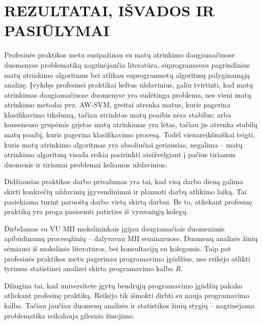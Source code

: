 
\section{REZULTATAI, IŠVADOS IR PASIŪLYMAI}
\label{rezultatai_isvados_pasiulymai}

Profesinės praktikos metu susipažinau su matų atrinkimo daugiamačiuose duomenyse problematiką nagrinėjančia literatūra, suprogramavau pagrindinius matų atrinkimo algoritmus bei atlikau suprogramuotų algoritmų palyginamąją analizę. Įvykdęs profesinei praktikai keltus uždavinius, galiu tvirtinti, kad matų atrinkimas daugiamačiuose duomenyse yra sudėtinga problema, nes vieni matų atrinkimo metodai pvz. AW-SVM, greitai atrenka matus, kurie pagerina klasifikavimo tikslumą, tačiau atrinktas matų poaibis nėra stabilus; arba konsensuso grupėmis grįstas matų atrinkimas yra lėtas, tačiau jis atrenka stabilų matų poaibį, kuris pagerina klasifikavimo procesą. Todėl vienareikšmiškai teigti, kuris matų atrinkimo algoritmas yra absoliučiai geriausias, negalima -- matų atrinkimo algoritmą visada reikia pasirinkti atsižvelgiant į pačius tiriamus duomenis ir tiriamai problemai keliamus uždavinius.

Didžiausias praktikos darbo privalumas yra tai, kad visą darbo dieną galima skirti konkrečių uždavinių įgyvendinimui ir planuoti darbų atlikimo laiką. Tai pasiekiama turint paruoštą darbo vietą skirtą darbui. Be to, atliekant profesinę praktiką yra proga pasisemti patirties iš vyresniųjų kolegų. 

Dirbdamas su VU MII mokslininkais įgijau daugiamačiais duomenimis apibūdinamų procesųžinių -- dalyvavau MII seminaruose. Duomenų analizės žinių sėmiausi iš mokslinės literatūros, bei konsultacijų su kolegomis. Taip pat profesinės praktikos metu pagerinau programavimo įgūdžius, nes reikėjo atlikti tyrimus statistinei analizei skirta programavimo kalba \textit{R}. 

Džiugina tai, kad universitete įgytų bendrųjų programavimo įgūdžių pakako atliekant profesinę praktiką. Reikėjo tik išmokti dirbti su nauja programavimo kalba. Tačiau jaučiau duomenų analizės ir statistikos žinių stygių -- nagrinėjama problematika reikalauja gilesnio žinojimo.


